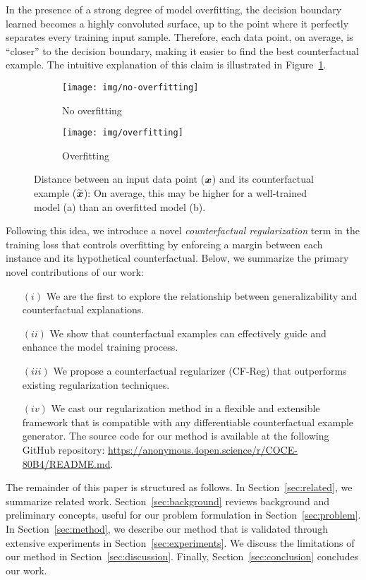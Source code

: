 In the presence of a strong degree of model overfitting, the decision boundary learned becomes a highly convoluted surface, up to the point where it perfectly separates every training input sample. 
Therefore, each data point, on average, is ``closer'' to the decision boundary, making it easier to find the best counterfactual example. 
The intuitive explanation of this claim is illustrated in Figure~\ref{fig:intuition}.

\begin{figure}
\centering
\begin{subfigure}[htb!]{.4\linewidth}
\texttt{[image: img/no-overfitting]}
\caption{No overfitting}
\end{subfigure}
\qquad
\begin{subfigure}[h]{.4\linewidth}
\texttt{[image: img/overfitting]}
\caption{Overfitting}
\end{subfigure}%
\caption{Distance between an input data point ($\boldsymbol{x}$) and its counterfactual example ($\widetilde{\boldsymbol{x}}$): On average, this may be higher for a well-trained model (a) than an overfitted model (b).}
\label{fig:intuition}
\end{figure}

Following this idea, we introduce a novel \textit{counterfactual regularization} term in the training loss that controls overfitting by enforcing a margin between each instance and its hypothetical counterfactual.
Below, we summarize the primary novel contributions of our work:
\begin{itemize}
\item[$(i)$] We are the first to explore the relationship between generalizability and counterfactual explanations.
\item[$(ii)$] We show that counterfactual examples can effectively guide and enhance the model training process.
\item[$(iii)$] We propose a counterfactual regularizer (CF-Reg) that outperforms existing regularization techniques.
\item[$(iv)$] We cast our regularization method in a flexible and extensible framework that is compatible with any differentiable counterfactual example generator. The source code for our method is available at the following GitHub repository: \url{https://anonymous.4open.science/r/COCE-80B4/README.md}.
\end{itemize}

The remainder of this paper is structured as follows. In Section~\ref{sec:related}, we summarize related work. Section~\ref{sec:background} reviews background and preliminary concepts, useful for our problem formulation in Section~\ref{sec:problem}. In Section~\ref{sec:method}, we describe our method that is validated through extensive experiments in Section~\ref{sec:experiments}. 
We discuss the limitations of our method in Section~\ref{sec:discussion}.
Finally, Section~\ref{sec:conclusion} concludes our work.
